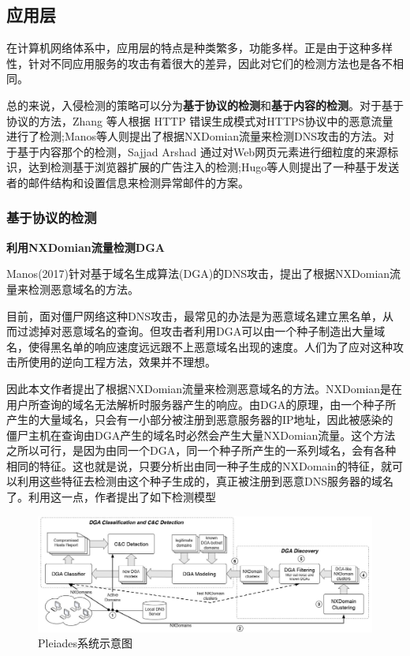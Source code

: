 \documentclass[12pt]{article} %
\begin{document}
\subsection{应用层}
\label{app}

在计算机网络体系中，应用层的特点是种类繁多，功能多样。正是由于这种多样性，针对不同应用服务的攻击有着很大的差异，因此对它们的检测方法也是各不相同。

总的来说，入侵检测的策略可以分为\textbf{基于协议的检测}和\textbf{基于内容的检测}。对于基于协议的方法，Zhang 等人根据 HTTP 错误生成模式对HTTPS协议中的恶意流量进行了检测;Manos等人则提出了根据NXDomian流量来检测DNS攻击的方法。对于基于内容那个的检测，Sajjad Arshad 通过对Web网页元素进行细粒度的来源标识，达到检测基于浏览器扩展的广告注入的检测;Hugo等人则提出了一种基于发送者的邮件结构和设置信息来检测异常邮件的方案。

\subsubsection{基于协议的检测}
\label{protocol}

\textbf{利用NXDomian流量检测DGA}


Manos(2017)\cite{Manos}针对基于域名生成算法(DGA)的DNS攻击，提出了根据NXDomian流量来检测恶意域名的方法。

目前，面对僵尸网络这种DNS攻击，最常见的办法是为恶意域名建立黑名单，从而过滤掉对恶意域名的查询。但攻击者利用DGA可以由一个种子制造出大量域名，使得黑名单的响应速度远远跟不上恶意域名出现的速度。人们为了应对这种攻击所使用的逆向工程方法，效果并不理想。

因此本文作者提出了根据NXDomian流量来检测恶意域名的方法。NXDomian是在用户所查询的域名无法解析时服务器产生的响应。由DGA的原理，由一个种子所产生的大量域名，只会有一小部分被注册到恶意服务器的IP地址，因此被感染的僵尸主机在查询由DGA产生的域名时必然会产生大量NXDomian流量。这个方法之所以可行，是因为由同一个DGA，同一个种子所产生的一系列域名，会有各种相同的特征。这也就是说，只要分析出由同一种子生成的NXDomain的特征，就可以利用这些特征去检测由这个种子生成的，真正被注册到恶意DNS服务器的域名了。利用这一点，作者提出了如下检测模型

\begin{figure}
	\caption{Pleiades系统示意图}
	\label{dga_pic}
	\includegraphics[width = \linewidth]{./pics/dga}
\end{figure}
\end{document}
